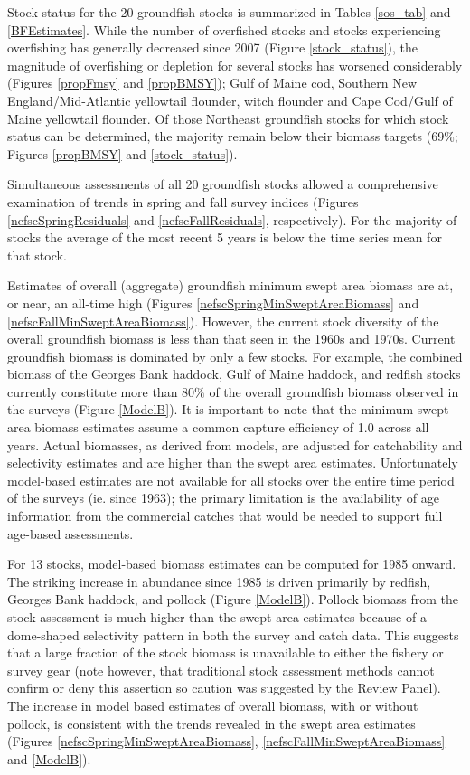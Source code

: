 Stock status for the 20 groundfish stocks is summarized in Tables \ref{sos_tab} and \ref{BFEstimates}.  While the number of overfished stocks and stocks experiencing overfishing has generally decreased since 2007 (Figure \ref{stock_status}), the magnitude of overfishing or depletion for several stocks has worsened considerably (Figures \ref{propFmsy} and \ref{propBMSY}); Gulf of Maine cod, Southern New England/Mid-Atlantic yellowtail flounder, witch flounder and Cape Cod/Gulf of Maine yellowtail flounder. Of those Northeast groundfish stocks for which stock status can be determined, the majority remain below their biomass targets ($69\%$; Figures \ref{propBMSY} and \ref{stock_status}).

Simultaneous assessments of all 20 groundfish stocks allowed a comprehensive examination of trends in spring and fall survey indices (Figures \ref{nefscSpringResiduals} and \ref{nefscFallResiduals}, respectively).  For the majority of stocks the average of the most recent 5 years is below the time series mean for that stock.

Estimates of overall (aggregate) groundfish minimum swept area biomass are at, or near, an all-time high (Figures \ref{nefscSpringMinSweptAreaBiomass} and \ref{nefscFallMinSweptAreaBiomass}). However, the current stock diversity of the overall groundfish biomass is less than that seen in the 1960s and 1970s. Current groundfish biomass is dominated by only a few stocks. For example, the combined biomass of the Georges Bank haddock, Gulf of Maine haddock, and redfish stocks currently constitute more than $80\%$ of the overall groundfish biomass observed in the surveys (Figure \ref{ModelB}).  It is important to note that the minimum swept area biomass estimates assume a common capture efficiency of 1.0 across all years.  Actual biomasses, as derived from models, are adjusted for catchability and selectivity estimates and are higher than the swept area estimates. Unfortunately model-based estimates are not available for all stocks over the entire time period of the surveys (ie. since 1963); the primary limitation is the availability of age information from the commercial catches that would be needed to support full age-based assessments.

For 13 stocks, model-based biomass estimates can be computed for 1985 onward.  The striking increase in abundance since 1985 is driven primarily by redfish, Georges Bank haddock, and pollock (Figure \ref{ModelB}). Pollock biomass from the stock assessment is much higher than the swept area estimates because of a dome-shaped selectivity pattern in both the survey and catch data. This suggests that a large fraction of the stock biomass is unavailable to either the fishery or survey gear (note however, that traditional stock assessment methods cannot confirm or deny this assertion so caution was suggested by the Review Panel). The increase in model based estimates of overall biomass, with or without pollock, is consistent with the trends revealed in the swept area estimates (Figures \ref{nefscSpringMinSweptAreaBiomass}, \ref{nefscFallMinSweptAreaBiomass} and \ref{ModelB}).   

